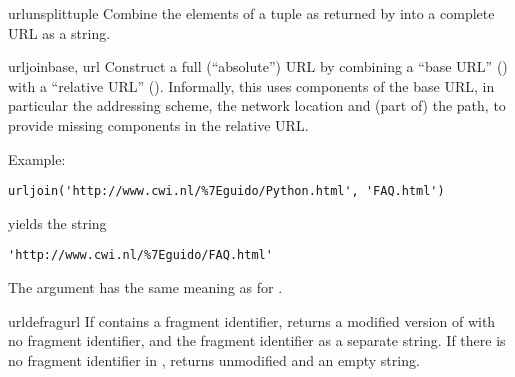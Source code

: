 \begin{funcdesc}{urlunsplit}{tuple}
Combine the elements of a tuple as returned by 
into a complete URL as a string.
\end{funcdesc}

\begin{funcdesc}{urljoin}{base, url}
Construct a full (``absolute'') URL by combining a ``base URL''
() with a ``relative URL'' ().  Informally, this
uses components of the base URL, in particular the addressing scheme,
the network location and (part of) the path, to provide missing
components in the relative URL.

Example:

\begin{verbatim}
urljoin('http://www.cwi.nl/%7Eguido/Python.html', 'FAQ.html')
\end{verbatim}

yields the string

\begin{verbatim}
'http://www.cwi.nl/%7Eguido/FAQ.html'
\end{verbatim}

The  argument has the same meaning as for
.
\end{funcdesc}

\begin{funcdesc}{urldefrag}{url}
If  contains a fragment identifier, returns a modified
version of  with no fragment identifier, and the fragment
identifier as a separate string.  If there is no fragment identifier
in , returns  unmodified and an empty string.
\end{funcdesc}


\begin{seealso}
\end{seealso}
